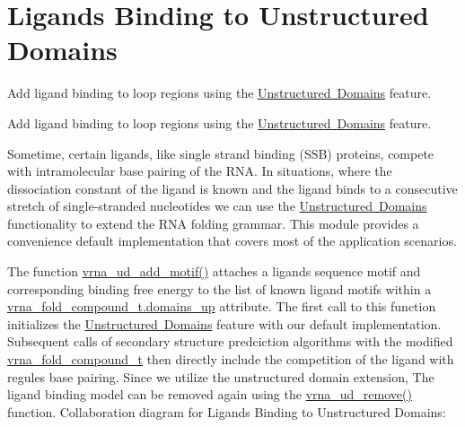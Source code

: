 \hypertarget{group__ligands__up}{}\section{Ligands Binding to Unstructured Domains}
\label{group__ligands__up}


Add ligand binding to loop regions using the \mbox{\hyperlink{group__domains__up}{Unstructured Domains}} feature.  


Add ligand binding to loop regions using the \mbox{\hyperlink{group__domains__up}{Unstructured Domains}} feature. 

Sometime, certain ligands, like single strand binding (S\+SB) proteins, compete with intramolecular base pairing of the R\+NA. In situations, where the dissociation constant of the ligand is known and the ligand binds to a consecutive stretch of single-\/stranded nucleotides we can use the \mbox{\hyperlink{group__domains__up}{Unstructured Domains}} functionality to extend the R\+NA folding grammar. This module provides a convenience default implementation that covers most of the application scenarios.

The function \mbox{\hyperlink{group__domains__up_ga55f7de5ef5b7472b0eeab9296b57f671}{vrna\+\_\+ud\+\_\+add\+\_\+motif()}} attaches a ligands sequence motif and corresponding binding free energy to the list of known ligand motifs within a \mbox{\hyperlink{group__fold__compound_a4f70b6d32681fc8ca061236f21819ae7}{vrna\+\_\+fold\+\_\+compound\+\_\+t.\+domains\+\_\+up}} attribute. The first call to this function initializes the \mbox{\hyperlink{group__domains__up}{Unstructured Domains}} feature with our default implementation. Subsequent calls of secondary structure predciction algorithms with the modified \mbox{\hyperlink{group__fold__compound_ga1b0cef17fd40466cef5968eaeeff6166}{vrna\+\_\+fold\+\_\+compound\+\_\+t}} then directly include the competition of the ligand with regules base pairing. Since we utilize the unstructured domain extension, The ligand binding model can be removed again using the \mbox{\hyperlink{group__domains__up_gada59cb0c498b812eadd010811af3f2d4}{vrna\+\_\+ud\+\_\+remove()}} function. Collaboration diagram for Ligands Binding to Unstructured Domains\+:
